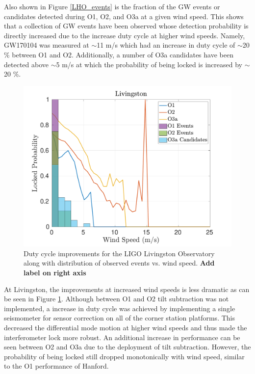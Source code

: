 \documentclass [12pt, proquest]{uwthesis}[2019]
\begin{document}
Also shown in Figure \ref{LHO_events} is the fraction of the GW events or candidates detected during O1, O2, and O3a at a given wind speed. This shows that a collection of GW events have been observed whose detection probability is directly increased due to the increase duty cycle at higher wind speeds. Namely, GW170104 was measured at $\sim$11 m/s which had an increase in duty cycle of $\sim$20 \% between O1 and O2. Additionally, a number of O3a candidates have been detected above $\sim$5 m/s at which the probability of being locked is increased by $\sim$20 \%.

\begin{figure}[!h]
\begin{center}
\includegraphics[width=\textwidth]{LLO_WindVsLockEvents.pdf}
\caption[Duty cycle improvements for the LIGO Livingston Observatory]{Duty cycle improvements for the LIGO Livingston Observatory along with distribution of observed events vs. wind speed. \textbf{Add label on right axis}}
\label{LLO_events}
\end{center}
\end{figure}

At Livingston, the improvements at increased wind speeds is less dramatic as can be seen in Figure \ref{LLO_events}. Although between O1 and O2 tilt subtraction was not implemented, a increase in duty cycle was achieved by implementing a single seismometer for sensor correction on all of the corner station platforms. This decreased the differential mode motion at higher wind speeds and thus made the interferometer lock more robust. An additional increase in performance can be seen between O2 and O3a due to the deployment of tilt subtraction. However, the probability of being locked still dropped monotonically with wind speed, similar to the O1 performance of Hanford.
\end{document}
